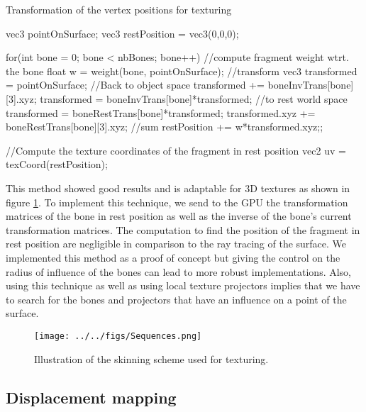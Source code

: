 \documentclass[annual]{acmsiggraph}
\begin{document}
\begin{algorithm}                      %
\caption{Transformation of the vertex positions for texturing}          %
\label{skinning}                           %
\begin{minipage}{0.9\textwidth}%
\CPP

vec3 pointOnSurface;
vec3 restPosition = vec3(0,0,0);	

for(int bone = 0; bone <  nbBones; bone++)
{
	//compute fragment weight wtrt. the bone
	float w = weight(bone, pointOnSurface);
	//transform
	vec3 transformed = pointOnSurface;
	//Back to object space
	transformed += boneInvTrans[bone][3].xyz;
	transformed = boneInvTrans[bone]*transformed;
	//to rest world space
	transformed = boneRestTrans[bone]*transformed;
	transformed.xyz += boneRestTrans[bone][3].xyz;
	//sum
	restPosition += w*transformed.xyz;;
}

//Compute the texture coordinates of the fragment in rest position
vec2 uv = texCoord(restPosition);

\END\PROGd{}

\end{minipage}%
\end{algorithm}


This method showed good results and is adaptable for 3D textures as shown in figure \ref{skinsequence}. To implement this technique, we send to the GPU the transformation matrices of the bone in rest position as well as the inverse of the bone's current transformation matrices. The computation to find the position of the fragment in rest position are negligible in comparison to the ray tracing of the surface. We implemented this method as a proof of concept but giving the control on the radius of influence of the bones can lead to more robust implementations. Also, using this technique as well as using local texture projectors implies that we have to search for the bones and projectors that have an influence on a point of the surface.

\begin{figure}[ht]
  \centering
  \texttt{[image: ../../figs/Sequences.png]}
  \caption{Illustration of the skinning scheme used for texturing.}
  \label{skinsequence}
\end{figure}

\subsection{Displacement mapping}
\end{document}
